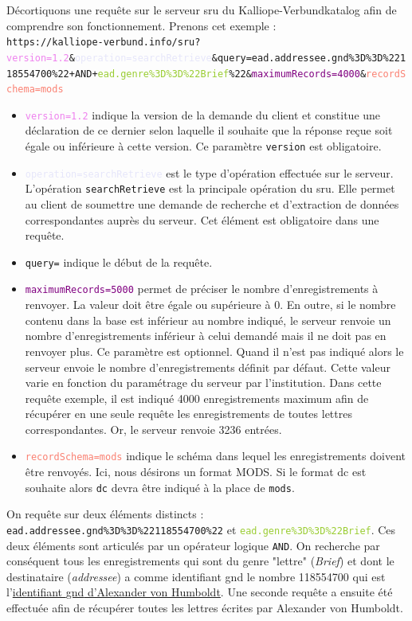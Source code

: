 \documentclass[a4paper, 12pt, twoside]{book}
\begin{document}
Décortiquons une requête sur le serveur \gls{sru} du Kalliope-Verbundkatalog afin de comprendre son fonctionnement. Prenons cet exemple : \\
\texttt{https://kalliope-verbund.info/sru?\textcolor{violet}{version=1.2}\&\textcolor{Lavender}{operation=searchRetrieve}\&\newline \textcolor{Peach}{query=}\textcolor{Emerald}{ead.addressee.gnd\%3D\%3D\%22118554700}\%22+AND+\textcolor{YellowGreen}{ead.genre\%3D\%3D\%22Brief}\newline\%22\&\textcolor{purple}{maximumRecords=4000}\&\textcolor{Salmon}{recordSchema=mods}}
\begin{itemize}
    \item \texttt{\textcolor{violet}{version=1.2}} indique la version de la demande du client et constitue une déclaration de ce dernier selon laquelle il souhaite que la réponse reçue soit égale ou inférieure à cette version. Ce paramètre \texttt{version} est obligatoire.  
    \item \texttt{\textcolor{Lavender}{operation=searchRetrieve}} est le type d'opération effectuée sur le serveur. L'opération \texttt{searchRetrieve} est la principale opération du \gls{sru}. Elle permet au client de soumettre une demande de recherche et d'extraction de données correspondantes auprès du serveur. Cet élément est obligatoire dans une requête.
    \item \texttt{\textcolor{Peach}{query=}} indique le début de la requête. 
    \item \texttt{\textcolor{purple}{maximumRecords=5000}} permet de préciser le nombre d'enregistrements à renvoyer. La valeur doit être égale ou supérieure à 0. En outre, si le nombre contenu dans la base est inférieur au nombre indiqué, le serveur renvoie un nombre d'enregistrements inférieur à celui demandé mais il ne doit pas en renvoyer plus. Ce paramètre est optionnel. Quand il n'est pas indiqué alors le serveur envoie le nombre d'enregistrements définit par défaut. Cette valeur varie en fonction du paramétrage du serveur par l'institution. Dans cette requête exemple, il est indiqué 4000 enregistrements maximum afin de récupérer en une seule requête les enregistrements de toutes lettres correspondantes. Or, le serveur renvoie 3236 entrées.
    \item \texttt{\textcolor{Salmon}{recordSchema=mods}} indique le schéma dans lequel les enregistrements doivent être renvoyés. Ici, nous désirons un format MODS. Si le format \gls{dc} est souhaite alors \texttt{dc} devra être indiqué à la place de \texttt{mods}. 
\end{itemize}
On requête sur deux éléments distincts : \texttt{\textcolor{Emerald}{ead.addressee.gnd\%3D\%3D\%22118554700\%22}} et \texttt{\textcolor{YellowGreen}{ead.genre\%3D\%3D\%22Brief}}. Ces deux éléments sont articulés par un opérateur logique \texttt{AND}. On recherche par conséquent tous les enregistrements qui sont du genre "lettre" (\textit{Brief}) et dont le destinataire (\textit{addressee}) a comme identifiant \gls{gnd} le nombre 118554700 qui est l'\href{http://d-nb.info/gnd/118554700}{identifiant \gls{gnd} d'Alexander von Humboldt}. Une seconde requête a ensuite été effectuée afin de récupérer toutes les lettres écrites par Alexander von Humboldt.
\end{document}
